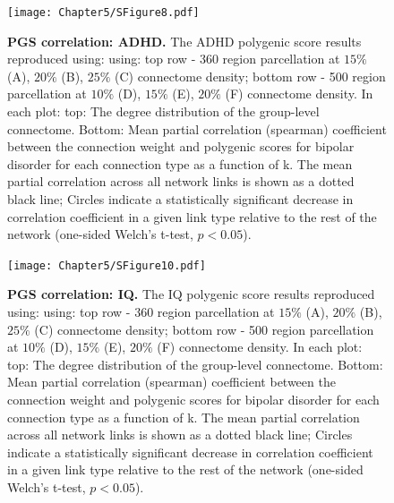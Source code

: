 \begin{figure}[h!]
\begin{center}
\texttt{[image: Chapter5/SFigure8.pdf]}%
\end{center}
\caption{\textbf{PGS correlation: ADHD.} 
The ADHD polygenic score results reproduced using: using: top row - 360 region parcellation at $15\%$ (A), $20\%$ (B), $25\%$ (C) connectome density; bottom row - 500 region parcellation at $10\%$ (D), $15\%$ (E), $20\%$ (F) connectome density. In each plot: top: The degree distribution of the group-level connectome. Bottom: Mean partial correlation (spearman) coefficient between the connection weight and polygenic scores for bipolar disorder for each connection type as a function of k. The mean partial correlation across all network links is shown as a dotted black line; Circles indicate a statistically significant decrease in correlation coefficient in a given link type relative to the rest of the network (one-sided Welch's t-test, $p < 0.05$).}
\label{fig:Ch5SFig8}
\end{figure}

\begin{figure}[h!]
\begin{center}
\texttt{[image: Chapter5/SFigure10.pdf]}%
\end{center}
\caption{\textbf{PGS correlation: IQ.} 
The IQ polygenic score results reproduced using: using: top row - 360 region parcellation at $15\%$ (A), $20\%$ (B), $25\%$ (C) connectome density; bottom row - 500 region parcellation at $10\%$ (D), $15\%$ (E), $20\%$ (F) connectome density. In each plot: top: The degree distribution of the group-level connectome. Bottom: Mean partial correlation (spearman) coefficient between the connection weight and polygenic scores for bipolar disorder for each connection type as a function of k. The mean partial correlation across all network links is shown as a dotted black line; Circles indicate a statistically significant decrease in correlation coefficient in a given link type relative to the rest of the network (one-sided Welch's t-test, $p < 0.05$).}
\label{fig:Ch5SFig10}
\end{figure}
 

